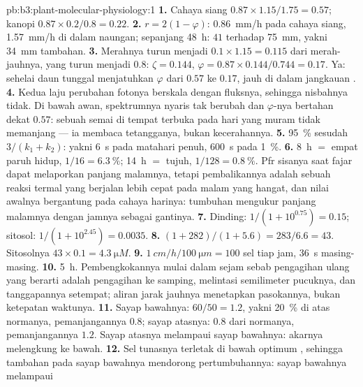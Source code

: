 \begin{solution}{pb:b3:plant-molecular-physiology:1}
\textbf{1.} Cahaya siang $0.87\times 1.15/1.75 = 0.57$; kanopi $0.87\times
0.2/0.8 = 0.22$.
\textbf{2.} $r = 2(1 - \varphi)$: \qty{0.86}{mm/h} pada cahaya siang,
\qty{1.57}{mm/h} di dalam naungan; sepanjang \qty{48}{h}: $41$ terhadap \qty{75}{mm},
yakni \qty{34}{mm} tambahan.
\textbf{3.} Merahnya turun menjadi $0.1\times 1.15 = 0.115$ dari merah-jauhnya, yang
turun menjadi $0.8$: $\zeta = 0.144$, $\varphi = 0.87\times 0.144/0.744 =
0.17$. Ya: sehelai daun tunggal menjatuhkan $\varphi$ dari $0.57$ ke $0.17$, jauh di
dalam jangkauan .
\textbf{4.} Kedua laju perubahan fotonya berskala dengan fluksnya, sehingga
nisbahnya tidak. Di bawah awan, spektrumnya nyaris tak berubah dan
$\varphi$-nya bertahan dekat $0.57$: sebuah semai di tempat terbuka pada hari yang muram tidak
memanjang --- ia membaca tetangganya, bukan kecerahannya.
\textbf{5.} \qty{95}{\%} sesudah $3/(k_{1} + k_{2})$: yakni \qty{6}{s} pada matahari
penuh, \qty{600}{s} pada \qty{1}{\%}.
\textbf{6.} \qty{8}{h} $=$ empat paruh hidup, $1/16 = \qty{6.3}{\%}$;
\qty{14}{h} $=$ tujuh, $1/128 = \qty{0.8}{\%}$. Pfr sisanya saat fajar
dapat melaporkan panjang malamnya, tetapi pembalikannya adalah sebuah reaksi termal
yang berjalan lebih cepat pada malam yang hangat, dan nilai awalnya bergantung pada
cahaya harinya: tumbuhan mengukur panjang malamnya dengan jamnya sebagai gantinya.
\textbf{7.} Dinding: $1/(1 + 10^{0.75}) = 0.15$; sitosol: $1/(1 +
10^{2.45}) = 0.0035$.
\textbf{8.} $(1 + 282)/(1 + 5.6) = 283/6.6 = 43$. Sitosolnya
$43\times 0.1 = \qty{4.3}{\micro M}$.
\textbf{9.} $\qty{1}{cm/h}/\qty{100}{\micro m} = 100$ sel tiap jam,
\qty{36}{s} masing-masing.
\textbf{10.} \qty{5}{h}. Pembengkokannya mulai dalam sejam sebab
pengagihan ulang yang berarti adalah pengagihan ke samping, melintasi semilimeter pucuknya,
dan tanggapannya setempat; aliran jarak jauhnya menetapkan pasokannya,
bukan ketepatan waktunya.
\textbf{11.} Sayap bawahnya: $60/50 = 1.2$, yakni  \qty{20}{\%} di atas normanya,
pemanjangannya $0.8$; sayap atasnya: $0.8$ dari normanya, pemanjangannya $1.2$. Sayap
atasnya melampaui sayap bawahnya: akarnya melengkung ke bawah.
\textbf{12.} Sel tunasnya terletak di bawah optimum , sehingga 
tambahan pada sayap bawahnya mendorong pertumbuhannya: sayap bawahnya melampaui

\end{solution}
